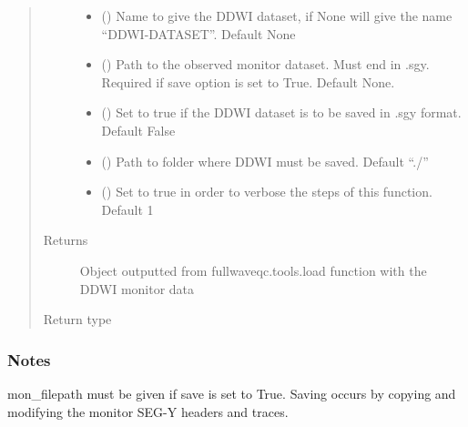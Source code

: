 \documentclass[letterpaper,10pt,english]{sphinxmanual}
\begin{document}
\begin{fulllineitems}
\begin{quote}
\begin{description}
\begin{itemize}
\item {} 
 (\sphinxstyleliteralemphasis{\sphinxupquote{, }}) \textendash{} Name to give the DDWI dataset, if None will give the name “DDWI-DATASET”.
Default None

\item {} 
 (\sphinxstyleliteralemphasis{\sphinxupquote{, }}) \textendash{} Path to the observed monitor dataset. Must end in .sgy. Required if save option
is set to True. Default None.

\item {} 
 (\sphinxstyleliteralemphasis{\sphinxupquote{, }}) \textendash{} Set to true if the DDWI dataset is to be saved in .sgy format. Default False

\item {} 
 (\sphinxstyleliteralemphasis{\sphinxupquote{, }}) \textendash{} Path to folder where DDWI must be saved. Default “./”

\item {} 
 (\sphinxstyleliteralemphasis{\sphinxupquote{, }}) \textendash{} Set to true in order to verbose the steps of this function. Default 1

\end{itemize}

\item[{Returns}] \leavevmode
{} \textendash{} Object outputted from fullwaveqc.tools.load function with the DDWI monitor data

\item[{Return type}] \leavevmode
{\hyperref[\detokenize{index:fullwaveqc.tools.SegyData}]{}}

\end{description}\end{quote}
\subsubsection*{Notes}

mon\_filepath must be given if save is set to True. Saving occurs by copying and modifying
the monitor SEG-Y headers and traces.

\end{fulllineitems}
\end{document}
